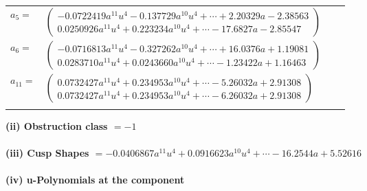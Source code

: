 \documentclass[1p]{elsarticle_modified}
\theoremstyle{definition}
\begin{document}
\begin{tabular}{m{7pt} m{180pt} m{7pt} m{180pt} }
\flushright $a_{5}=$&$\begin{pmatrix}-0.0722419 a^{11} u^{4}-0.137729 a^{10} u^{4}+\cdots+2.20329 a-2.38563\\0.0250926 a^{11} u^{4}+0.223234 a^{10} u^{4}+\cdots-17.6827 a-2.85547\end{pmatrix}$ \\
\flushright $a_{6}=$&$\begin{pmatrix}-0.0716813 a^{11} u^{4}-0.327262 a^{10} u^{4}+\cdots+16.0376 a+1.19081\\0.0283710 a^{11} u^{4}+0.0243660 a^{10} u^{4}+\cdots-1.23422 a+1.16463\end{pmatrix}$ \\
\flushright $a_{11}=$&$\begin{pmatrix}0.0732427 a^{11} u^{4}+0.234953 a^{10} u^{4}+\cdots-5.26032 a+2.91308\\0.0732427 a^{11} u^{4}+0.234953 a^{10} u^{4}+\cdots-6.26032 a+2.91308\end{pmatrix}$\\&\end{tabular}
\flushleft \textbf{(ii) Obstruction class $= -1$}\\~\\
\flushleft \textbf{(iii) Cusp Shapes $= -0.0406867 a^{11} u^{4}+0.0916623 a^{10} u^{4}+\cdots-16.2544 a+5.52616$}\\~\\
\newpage\renewcommand{\arraystretch}{1}
\flushleft \textbf{(iv) u-Polynomials at the component}\newline \\
\end{document}

